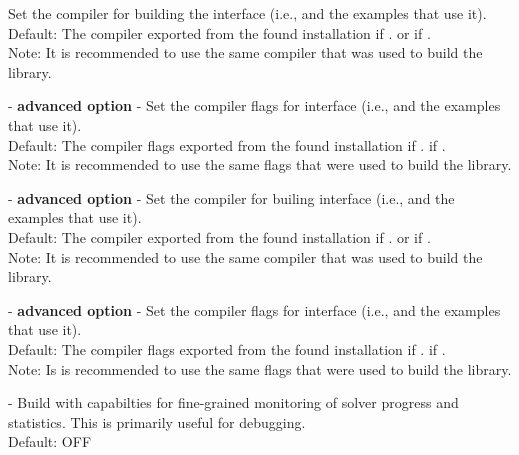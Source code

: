 \begin{description}
  Set the {\CC} compiler for building the {\trilinos} interface
  (i.e., {\nvectrilinos} and the examples that use it).
  \\
  Default: The {\CC} compiler exported from the found {\trilinos} installation
  if .  or  if .
  \\
  Note: It is recommended to use the same compiler that was used to build the {\trilinos} library.
\item[\id{TRILINOS\_INTERFACE\_C\_COMPILER\_FLAGS}] - \textbf{advanced option} -
  Set the {\CC} compiler flags for {\trilinos} interface
  (i.e., {\nvectrilinos} and the examples that use it).
  \\
  Default: The {\CC} compiler flags exported from the found {\trilinos} installation
  if .  if .
  \\
  Note: It is recommended to use the same flags that were used to build the {\trilinos} library.
\item[\id{TRILINOS\_INTERFACE\_CXX\_COMPILER}] - \textbf{advanced option} -
  Set the {\CPP} compiler for builing {\trilinos} interface
  (i.e., {\nvectrilinos} and the examples that use it).
  \\
  Default: The {\CPP} compiler exported from the found {\trilinos} installation
  if .  or  if .
  \\
  Note: It is recommended to use the same compiler that was used to build the {\trilinos} library.
\item[\id{TRILINOS\_INTERFACE\_CXX\_COMPILER\_FLAGS}] - \textbf{advanced option} -
  Set the {\CPP} compiler flags for {\trilinos} interface
  (i.e., {\nvectrilinos} and the examples that use it).
  \\
  Default: The {\CPP} compiler flags exported from the found {\trilinos} installation
  if .  if .
  \\
  Note: Is is recommended to use the same flags that were used to build the {\trilinos} library.
\item[\id{SUNDIALS\_BUILD\_WITH\_MONITORING}] -
  Build {\sundials} with capabilties for fine-grained monitoring of solver progress
  and statistics. This is primarily useful for debugging.
  \\
  Default: OFF

\end{description}
